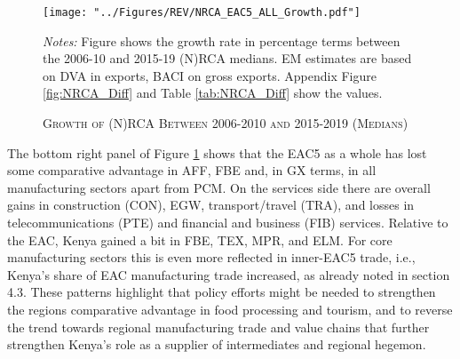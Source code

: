 \documentclass[a4paper]{article}
\begin{document}
\begin{figure}[h!]
\centering
\caption{\label{fig:NRCA_GR}\textsc{Growth of (N)RCA Between 2006-2010 and 2015-2019 (Medians)}}
\texttt{[image: "../Figures/REV/NRCA\_EAC5\_ALL\_Growth.pdf"]} %
\raggedright
\scriptsize
\emph{Notes:} Figure shows the growth rate in percentage terms between the 2006-10 and 2015-19 (N)RCA medians. EM estimates are based on DVA in exports, BACI on gross exports. Appendix Figure \ref{fig:NRCA_Diff} and Table \ref{tab:NRCA_Diff} show the values. 
\end{figure}
\FloatBarrier

The bottom right panel of Figure \ref{fig:NRCA_GR} shows that the EAC5 as a whole has lost some comparative advantage in AFF, FBE and, in GX terms, in all manufacturing sectors apart from PCM. On the services side there are overall gains in construction (CON), EGW, transport/travel (TRA), and losses in telecommunications (PTE) and financial and business (FIB) services. Relative to the EAC, Kenya gained a bit in FBE, TEX, MPR, and ELM. For core manufacturing sectors this is even more reflected in inner-EAC5 trade, i.e., Kenya's share of EAC manufacturing trade increased, as already noted in section 4.3. These patterns highlight that policy efforts might be needed to strengthen the regions comparative advantage in food processing and tourism, and to reverse the trend towards regional manufacturing trade and value chains that further strengthen Kenya's role as a supplier of intermediates and regional hegemon. 
\end{document}
